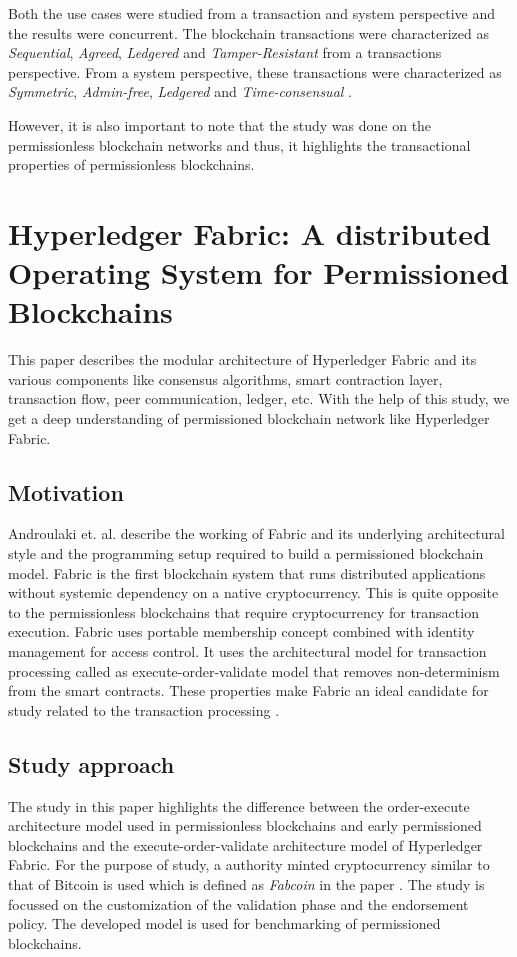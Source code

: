 \documentclass[
  a4paper,  %
  twoside,  %
  bibliography=totoc,
  headsepline,
  cleardoublepage=empty,
  parskip=half,
  draft=false
]{scrbook}
\begin{document}
Both the use cases were studied from a transaction and system perspective and the results were concurrent. The blockchain transactions were characterized as \textit{Sequential}, \textit{Agreed}, \textit{Ledgered} and \textit{Tamper-Resistant} from a transactions perspective. From a system perspective, these transactions were characterized as \textit{Symmetric}, \textit{Admin-free}, \textit{Ledgered} and \textit{Time-consensual} \cite{Salt}.

However, it is also important to note that the study was done on the permissionless blockchain networks and thus, it highlights the transactional properties of permissionless blockchains.

\section{Hyperledger Fabric: A distributed Operating System for Permissioned Blockchains}
\label{sec:2}
This paper describes the modular architecture of Hyperledger Fabric and its various components like consensus algorithms, smart contraction layer, transaction flow, peer communication, ledger, etc. With the help of this study, we get a deep understanding of permissioned blockchain network like Hyperledger Fabric.

\subsection{Motivation}
Androulaki et. al. describe the working of Fabric and its underlying architectural style and the programming setup required to build a permissioned blockchain model. Fabric is the first blockchain system that runs distributed applications without systemic dependency on a native cryptocurrency. This is quite opposite to the permissionless blockchains that require cryptocurrency for transaction execution. Fabric uses portable membership concept combined with identity management for access control. It uses the architectural model for transaction processing called as execute-order-validate model that removes non-determinism from the smart contracts. These properties make Fabric an ideal candidate for study related to the transaction processing \cite{HF}. 

\subsection{Study approach}
The study in this paper highlights the difference between the order-execute architecture model used in permissionless blockchains and early permissioned blockchains and the execute-order-validate architecture model of Hyperledger Fabric. For the purpose of study, a authority minted cryptocurrency similar to that of Bitcoin is used which is defined as \textit{Fabcoin} in the paper \cite{HF}. The study is focussed on the customization of the validation phase and the endorsement policy. The developed model is used for benchmarking of permissioned blockchains.
\end{document}
